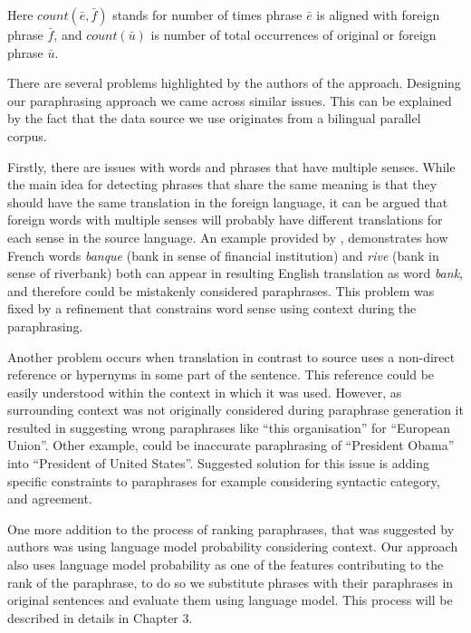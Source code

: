 \begin{center}
\textit{\cite{Callison-Burch2007}}
\end{center}

Here $count(\bar{e}, \bar{f})$ stands for number of times phrase $\bar{e}$ is aligned with foreign phrase $\bar{f}$, and $count(\bar{u})$ is number of total occurrences of original or foreign phrase $\bar{u}$. 

There are several problems highlighted by the authors of the approach. Designing our paraphrasing approach we came across similar issues. This can be explained by the fact that the data source we use originates from a bilingual parallel corpus.  

Firstly, there are issues with words and phrases that have multiple senses. While the main idea for detecting phrases that share the same meaning is that they should have the same translation in the foreign language, it can be argued that foreign words with multiple senses will probably have different translations for each sense in the source language. An example provided by \cite{Callison-Burch2007}, demonstrates how French words \textit{banque} (bank in sense of financial institution) and \textit{rive} (bank in sense of riverbank) both can appear in resulting English translation as word \textit{bank}, and therefore could be mistakenly considered paraphrases. This problem was fixed by a refinement that constrains word sense using context during the paraphrasing. 

Another problem occurs when translation in contrast to source uses a non-direct reference or hypernyms in some part of the sentence. This reference could be easily understood within the context in which it was used. However, as surrounding context was not originally considered during paraphrase generation it resulted in suggesting wrong paraphrases like ``this organisation'' for ``European Union''. Other example, could be inaccurate paraphrasing of ``President Obama'' into ``President of United States''. Suggested solution for this issue is adding specific constraints to paraphrases for example considering syntactic category, and agreement.

One more addition to the process of ranking paraphrases, that was suggested by authors was using language model probability considering context. Our approach also uses language model probability as one of the features contributing to the rank of the paraphrase, to do so we substitute phrases with their paraphrases in original sentences and evaluate them using language model. This process will be described in details in Chapter 3.


